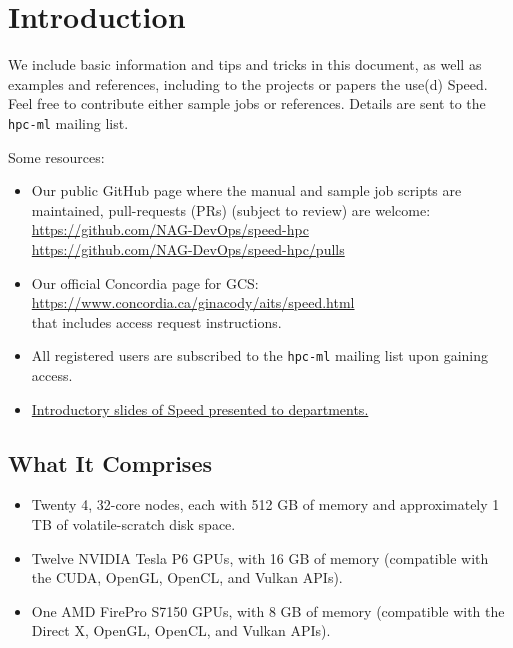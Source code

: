 \documentclass{easychair}
\begin{document}
\section{Introduction}

We include basic information and tips and tricks in this document,
as well as examples and references, including to the projects or
papers the use(d) Speed. Feel free to contribute either sample jobs
or references. Details are sent to the \texttt{hpc-ml} mailing list.

Some resources:

\begin{itemize}
\item
Our public GitHub page where the manual and sample job scripts
are maintained, pull-requests (PRs) (subject to review) are welcome:\\
\url{https://github.com/NAG-DevOps/speed-hpc}\\
\url{https://github.com/NAG-DevOps/speed-hpc/pulls}

\item
Our official Concordia page for GCS:\\
\url{https://www.concordia.ca/ginacody/aits/speed.html}\\
that includes access request instructions.

\item
All registered users are subscribed to the \texttt{hpc-ml} mailing
list upon gaining access.

\item
\href{https://docs.google.com/presentation/d/1bWbGQvYsuJ4U2WsfLYp8S3yb4i7OdU7QDn3l_Q9mYis}{Introductory slides of Speed presented to departments.}

\end{itemize}

\subsection{What It Comprises}

\begin{itemize}
\item
Twenty 4, 32-core nodes, each with 512 GB of memory and approximately 1 TB of volatile-scratch disk space. 
\item
Twelve NVIDIA Tesla P6 GPUs, with 16 GB of memory (compatible with the CUDA, OpenGL, OpenCL, and Vulkan APIs). 
\item
One AMD FirePro S7150 GPUs, with 8 GB of memory (compatible with the Direct X, OpenGL, OpenCL, and Vulkan APIs). 
\end{itemize}
\end{document}
